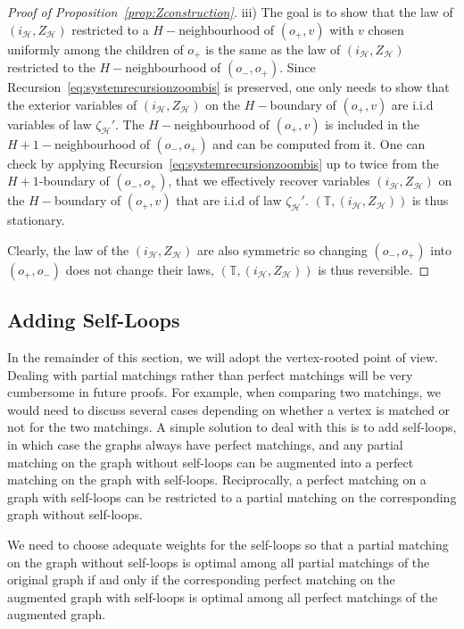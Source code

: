 \documentclass[11pt]{article}
\begin{document}
\begin{proof}[Proof of Proposition~\ref{prop:Zconstruction}]
iii) The goal is to show that the law of $(i_{\mathcal{H}},Z_{\mathcal{H}})$ restricted to a $H-$neighbourhood of $(o_+,v)$ with $v$ chosen uniformly among the children of $o_+$ is the same as the law of $(i_{\mathcal{H}},{Z}_{\mathcal{H}})$ restricted to the $H-$neighbourhood of $(o_-,o_+)$.
Since Recursion~\eqref{eq:systemrecursionzoombis} is preserved, one only needs to show that the exterior variables of  $(i_{\mathcal{H}},Z_{\mathcal{H}})$ on the $H-$boundary of $(o_+,v)$ are i.i.d variables of law $\zeta_{\mathcal{H}}'$.
The $H-$neighbourhood of $(o_+,v)$ is included in the $H+1-$neighbourhood of $(o_-,o_+)$ and can be computed from it. One can check by applying Recursion~\eqref{eq:systemrecursionzoombis} up to twice from the $H+1$-boundary of $(o_-,o_+)$, that we effectively recover variables $(i_{\mathcal{H}},Z_{\mathcal{H}})$ on the $H-$boundary of $(o_+,v)$ that are i.i.d of law $\zeta_{\mathcal{H}}'$.
$(\mathbb{T},(i_{\mathcal{H}},Z_{\mathcal{H}}))$ is thus stationary. 

Clearly, the law of the $(i_{\mathcal{H}},Z_{\mathcal{H}})$ are also symmetric so changing $(o_-,o_+)$ into $(o_+,o_-)$ does not change their laws, $(\mathbb{T},(i_{\mathcal{H}},Z_{\mathcal{H}}))$ is thus reversible. 
\end{proof}


\subsection{Adding Self-Loops}
In the remainder of this section, we will adopt the vertex-rooted point of view. Dealing with partial matchings rather than perfect matchings will be very cumbersome in future proofs. For example, when comparing two matchings, we would need to discuss several cases depending on whether a vertex is matched or not for the two matchings. A simple solution to deal with this is to add self-loops, in which case the graphs always have perfect matchings, and any partial matching on the graph without self-loops can be augmented into a perfect matching on the graph with self-loops. Reciprocally, a perfect matching on a graph with self-loops can be restricted to a partial matching on the corresponding graph without self-loops. 

We need to choose adequate weights for the self-loops so that a partial matching on the graph without self-loops is optimal among all partial matchings of the original graph if and only if the corresponding perfect matching on the augmented graph with self-loops is optimal among all perfect matchings of the augmented graph.
\end{document}
